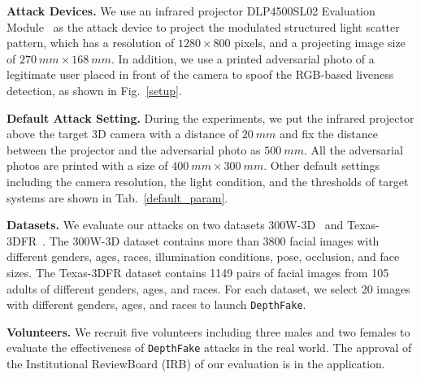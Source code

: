 \textbf{Attack Devices.} We use an infrared projector DLP4500SL02 Evaluation Module~\cite{chong2017intraoperative} as the attack device to project the modulated structured light scatter pattern, which has a resolution of $1280 \times 800$ pixels, and a projecting image size of $270~mm \times 168~mm$.
In addition, we use a printed adversarial photo of a legitimate user placed in front of the camera to spoof the RGB-based liveness detection, as shown in Fig.~\ref{setup}.

\textbf{Default Attack Setting.} During the experiments, we put the infrared projector above the target 3D camera with a distance of $20~mm$ and fix the distance between the projector and the adversarial photo as $500~mm$.
All the adversarial photos are printed with a  size of $400~mm \times 300~mm$.
Other default settings including the camera resolution, the light condition, and the thresholds of target systems are shown in Tab.~\ref{default_param}.


\textbf{Datasets.} We evaluate our attacks on two datasets 300W-3D~\cite{zhu2016face} and Texas-3DFR~\cite{gupta2010anthropometric, gupta2010texas}. 
The 300W-3D dataset contains more than 3800 facial images with different genders, ages, races, illumination conditions, pose, occlusion, and face sizes. 
The Texas-3DFR dataset contains 1149 pairs of facial images from 105 adults of different genders, ages, and races.
For each dataset, we select 20 images with different genders, ages, and races to launch \texttt{DepthFake}.


\textbf{Volunteers.} We recruit five volunteers including three males and two females to evaluate the effectiveness of \texttt{DepthFake} attacks in the real world. The approval of the Institutional ReviewBoard (IRB) of our evaluation is in the application.



